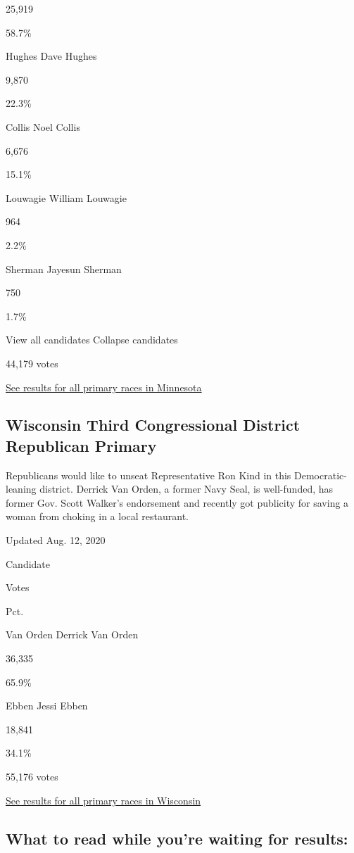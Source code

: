 25,919

58.7\%

 Hughes Dave Hughes

9,870

22.3\%

 Collis Noel Collis

6,676

15.1\%

 Louwagie William Louwagie

964

2.2\%

 Sherman Jayesun Sherman

750

1.7\%

View all candidates Collapse candidates

44,179 votes

\href{https://www.nytimes3xbfgragh.onion/interactive/2020/08/11/us/elections/results-minnesota-primary-elections.html}{See
results for all primary races in Minnesota}

\hypertarget{wisconsin-third-congressional-district-republican-primary}{%
\subsection{Wisconsin Third Congressional District Republican
Primary}\label{wisconsin-third-congressional-district-republican-primary}}

Republicans would like to unseat Representative Ron Kind in this
Democratic-leaning district. Derrick Van Orden, a former Navy Seal, is
well-funded, has former Gov. Scott Walker's endorsement and recently got
publicity for saving a woman from choking in a local restaurant.

Updated Aug. 12, 2020

Candidate

Votes

Pct.

 Van Orden Derrick Van Orden

36,335

65.9\%

 Ebben Jessi Ebben

18,841

34.1\%

55,176 votes

\href{https://www.nytimes3xbfgragh.onion/interactive/2020/08/11/us/elections/results-wisconsin-primary-elections.html}{See
results for all primary races in Wisconsin}

\hypertarget{what-to-read-while-youre-waiting-for-results}{%
\subsection{What to read while you're waiting for
results:}\label{what-to-read-while-youre-waiting-for-results}}

